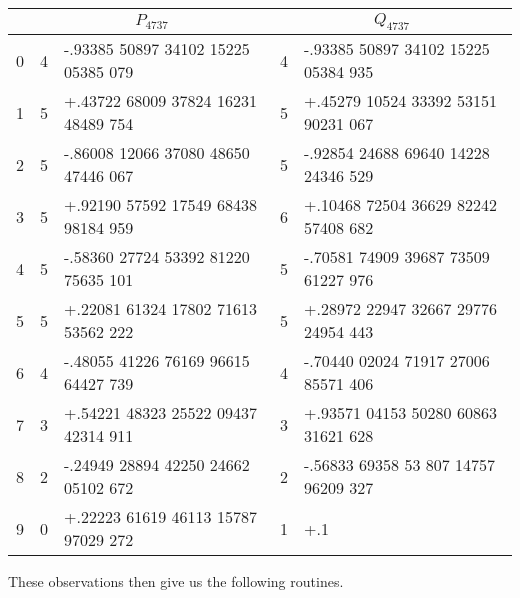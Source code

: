 \begin{center}
\begin{tabular}{|c||c|l||c|l|}
\hline
& \multicolumn{2}{c||}{$P_{4737}$} & \multicolumn{2}{c|}{$Q_{4737}$}  \\
\hline
0  &  4  & -.93385 50897 34102 15225 05385 079 & 4 & -.93385 50897 34102 15225 05384 935 \\
1  &  5  & +.43722 68009 37824 16231 48489 754 & 5 & +.45279 10524 33392 53151 90231 067 \\
2  &  5  & -.86008 12066 37080 48650 47446 067 & 5 & -.92854 24688 69640 14228 24346 529\\ 
3  &  5  & +.92190 57592 17549 68438 98184 959 & 6 & +.10468 72504 36629 82242 57408 682 \\
4  &  5  & -.58360 27724 53392 81220 75635 101 & 5 & -.70581 74909 39687 73509 61227 976 \\ 
5  &  5  & +.22081 61324 17802 71613 53562 222  & 5 & +.28972 22947 32667 29776 24954 443 \\ 
6  &  4  & -.48055 41226 76169 96615 64427 739 & 4 & -.70440 02024 71917 27006 85571 406 \\ 
7  &  3  & +.54221 48323 25522 09437 42314 911 & 3 & +.93571 04153 50280 60863 31621 628 \\
8  & 2  & -.24949 28894 42250 24662 05102 672 & 2 & -.56833 69358 53 807 14757 96209 327 \\
9  & 0  & +.22223 61619 46113 15787 97029 272 & 1 & +.1 \\
\hline
\end{tabular}
\end{center}
These observations then give us the following routines.

\iffalse
First a protocol for \verb|arcsin| based on square root, that is not currently implemented, a version of the protocol using polynomial approximation, which is implemented, and methods for \verb|arccos| and \verb|arctan|.

\msubsubsection{$\mathsf{F\star ArcSin}(\sshare{x})$}
\begin{enumerate}
\item $\sshare{x^2} \asn \mathsf{F\star Mult}(\sshare{x},\sshare{x})$.
\item $\sshare{-x^2} \asn \mathsf{F\star Neg}(\sshare{x^2})$.
\item $\sshare{1-x^2} \asn \mathsf{F\star Add}(1,\sshare{-x^2})$.
\item $\sshare{\sqrt{1-x^2}} \asn \mathsf{F\star Sqrt}(1,\sshare{1-x^2})$.
\item $\sshare{v} \asn \mathsf{F\star Div}(\sshare{x},\sshare{\sqrt{1-x^2}})$.
\item $\sshare{y} \asn \mathsf{F\star ArcTan}(\sshare{v})$.
\item If $\star=\mathsf{L}$
\begin{enumerate}
  \item $\sshare{|x|} \asn \mathsf{FLAbs}(\sshare{x})$.
  \item $\sshare{y_\err} \asn \mathsf{FLGT}(\sshare{|x|},1.0)$.
\end{enumerate}
\item Return $\sshare{y}$.
\end{enumerate}
\fi

